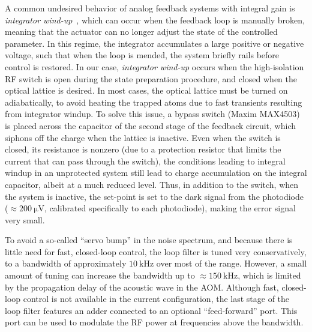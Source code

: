 \documentclass[twocolumn,aip,rsi,reprint,bibnotes]{revtex4-1}
\newcommand\unit[2]{\ensuremath{#1~\mathrm{{#2}}}}
\begin{document}
A common undesired behavior of analog feedback systems with integral gain is \emph{integrator wind-up}~\cite{Bechhoefer2005}, which can occur when the feedback loop is manually broken, meaning that the actuator can no longer adjust the state of the controlled parameter.
In this regime, the integrator accumulates a large positive or negative voltage, such that when the loop is mended, the system briefly rails before control is restored.
In our case, \emph{integrator wind-up} occurs when the high-isolation RF switch is open during the state preparation procedure, and closed when the optical lattice is desired.
In most cases, the optical lattice must be turned on adiabatically, to avoid heating the trapped atoms due to fast transients resulting from integrator windup.
To solve this issue, a bypass switch (Maxim MAX4503) is placed across the capacitor of the second stage of the feedback circuit, which siphons off the charge when the lattice is inactive.
Even when the switch is closed, its resistance is nonzero (due to a protection resistor that limits the current that can pass through the switch), the conditions leading to integral windup in an unprotected system still lead to charge accumulation on the integral capacitor, albeit at a much reduced level.
Thus, in addition to the switch, when the system is inactive, the set-point is set to the dark signal from the photodiode ($\approx$\unit{200}{\mu{}V}, calibrated specifically to each photodiode), making the error signal very small.

To avoid a so-called ``servo bump'' in the noise spectrum, and because there is little need for fast, closed-loop control, the loop filter is tuned very conservatively, to a bandwidth of approximately \unit{10}{kHz} over most of the range.
However, a small amount of tuning can increase the bandwidth up to $\approx$\unit{150}{kHz}, which is limited by the propagation delay of the acoustic wave in the AOM.
Although fast, closed-loop control is not available in the current configuration, the last stage of the loop filter features an adder connected to an optional ``feed-forward'' port.
This port can be used to modulate the RF power at frequencies above the bandwidth.
\end{document}
